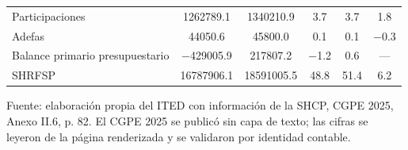 \begin{table}[htbp]
\begin{tabular}{L{4.2cm}SSSSS}
{Participaciones} & \num{1262789.1} & \num{1340210.9} & \num{3.7} & \num{3.7} & \num{1.8} \\
{Adefas} & \num{44050.6} & \num{45800.0} & \num{0.1} & \num{0.1} & \num{-0.3} \\
{Balance primario presupuestario} & \num{-429005.9} & \num{217807.2} & \num{-1.2} & \num{0.6} & {---} \\
{SHRFSP} & \num{16787906.1} & \num{18591005.5} & \num{48.8} & \num{51.4} & \num{6.2} \\
\bottomrule
\end{tabular}
\par\vspace{2pt}\footnotesize Fuente: elaboración propia del ITED con información de la SHCP, CGPE 2025, Anexo II.6, p. 82. El CGPE 2025 se publicó sin capa de texto; las cifras se leyeron de la página renderizada y se validaron por identidad contable.
\end{table}

